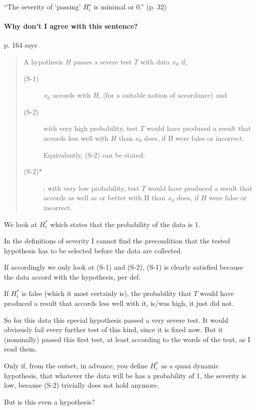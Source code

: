 \documentclass{article}
\begin{document}
\enquote{The severity of \enquote{passing} $H_i^∗$ is minimal or 0.} (p. 32)

\paragraph{Why don't I agree with this sentence?} p. 164 says

\begin{quote}
  A hypothesis $H$ passes a severe test $T$ with data $x_0$ if,
  \begin{description}
  \item [(S-1)] $x_0$ accords with $H$, (for a suitable notion of accordance) and
    
  \item [(S-2)] with very high probability, test $T$ would have produced a result
    that accords less well with $H$ than $x_0$ does, if H were false or incorrect.
    
    Equivalently, (S-2) can be stated:

    
  \item [(S-2)*]: with very low probability, test $T$ would have produced a result
    that accords as well as or better with H than $x_0$ does, if $H$ were false
    or incorrect.
  \end{description}
\end{quote}

We look at $H_i^*$ which states that the probability of the data is 1.

In the definitions of severity I cannot find the precondition that the tested hypothesis has to be selected before the data are collected.

If accordingly we only look at (S-1) and (S-2), (S-1) is clearly satisfied because the data accord with the hypothesis, per def.

If $H_i^*$ is false (which it most certainly is), the probability that $T$ would have produced a result that accords less well with it, is/was high, it just did not.

So for this data this special hypothesis passed a very severe test. It would obviously fail every further test of this kind, since it is fixed now. But it (nominally) passed this first test, at least according to the words of the text, as I read them.


Only if, from the outset, in advance, you define $H_i^*$ as a quasi dynamic hypothesis, that whatever the data will be has a probability of 1, the severity is low, because (S-2) trivially does not hold anymore.

But is this even a hypothesis?
\end{document}
